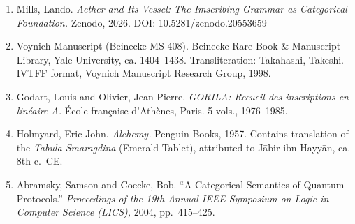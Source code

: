 \documentclass[12pt,a4paper]{article}
\begin{document}
\begin{enumerate}
\def\labelenumi{\arabic{enumi}.}
\item
  Mills, Lando. \emph{Aether and Its Vessel: The Imscribing Grammar as
  Categorical Foundation.} Zenodo, 2026. DOI: 10.5281/zenodo.20553659
\item
  Voynich Manuscript (Beinecke MS 408). Beinecke Rare Book \& Manuscript
  Library, Yale University, ca. 1404--1438. Transliteration: Takahashi,
  Takeshi. IVTFF format, Voynich Manuscript Research Group, 1998.
\item
  Godart, Louis and Olivier, Jean-Pierre. \emph{GORILA: Recueil des
  inscriptions en linéaire A.} École française d'Athènes, Paris. 5
  vols., 1976--1985.
\item
  Holmyard, Eric John. \emph{Alchemy.} Penguin Books, 1957. Contains
  translation of the \emph{Tabula Smaragdina} (Emerald Tablet),
  attributed to Jābir ibn Hayyān, ca. 8th c.~CE.
\item
  Abramsky, Samson and Coecke, Bob. ``A Categorical Semantics of Quantum
  Protocols.'' \emph{Proceedings of the 19th Annual IEEE Symposium on
  Logic in Computer Science (LICS),} 2004, pp.~415--425.
\end{enumerate}
\end{document}
